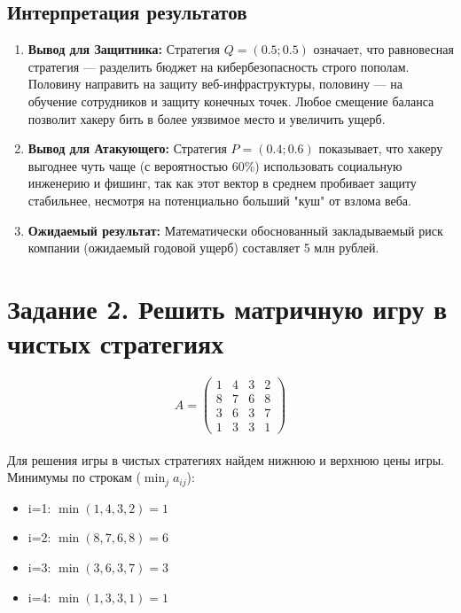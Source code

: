 \documentclass[a4paper,12pt]{article}
\begin{document}
\subsection*{Интерпретация результатов}
\begin{enumerate}
    \item \textbf{Вывод для Защитника:} Стратегия $Q = (0.5; 0.5)$ означает, что равновесная стратегия — разделить бюджет на кибербезопасность строго пополам. Половину направить на защиту веб-инфраструктуры, половину — на обучение сотрудников и защиту конечных точек. Любое смещение баланса позволит хакеру бить в более уязвимое место и увеличить ущерб.
    \item \textbf{Вывод для Атакующего:} Стратегия $P = (0.4; 0.6)$ показывает, что хакеру выгоднее чуть чаще (с вероятностью 60\%) использовать социальную инженерию и фишинг, так как этот вектор в среднем пробивает защиту стабильнее, несмотря на потенциально больший "куш" от взлома веба.
    \item \textbf{Ожидаемый результат:} Математически обоснованный закладываемый риск компании (ожидаемый годовой ущерб) составляет 5 млн рублей.
\end{enumerate}






\section*{Задание 2. Решить матричную игру в чистых стратегиях}

$$A = \begin{pmatrix} 1 & 4 & 3 & 2 \\ 8 & 7 & 6 & 8 \\ 3 & 6 & 3 & 7 \\ 1 & 3 & 3 & 1 \end{pmatrix}$$ \\

Для решения игры в чистых стратегиях найдем нижнюю и верхнюю цены игры.\\

Минимумы по строкам ($\min_j a_{ij}$):
\begin{itemize}
    \item i=1: $\min(1, 4, 3, 2) = 1$
    \item i=2: $\min(8, 7, 6, 8) = 6$
    \item i=3: $\min(3, 6, 3, 7) = 3$
    \item i=4: $\min(1, 3, 3, 1) = 1$
\end{itemize}
\end{document}
